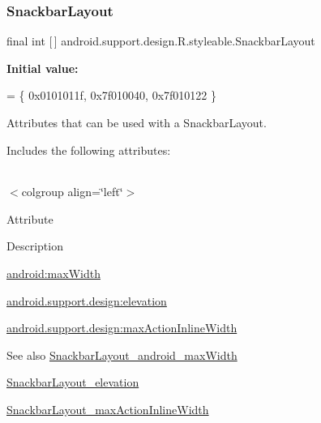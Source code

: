 \subsubsection{\texorpdfstring{Snackbar\+Layout}{SnackbarLayout}}
{\footnotesize\ttfamily final int \mbox{[}$\,$\mbox{]} android.\+support.\+design.\+R.\+styleable.\+Snackbar\+Layout\hspace{0.3cm}{\ttfamily [static]}}

{\bfseries Initial value\+:}
\begin{DoxyCode}
= \{
            0x0101011f, 0x7f010040, 0x7f010122
        \}
\end{DoxyCode}
Attributes that can be used with a Snackbar\+Layout. 

Includes the following attributes\+:

\tabulinesep=1mm
\begin{longtabu} spread 0pt [c]{*{0}{|X[-1]}|}
\hline
\end{longtabu}
$<$colgroup align=\char`\"{}left\char`\"{}$>$ 

Attribute

Description 

{\ttfamily \hyperlink{classandroid_1_1support_1_1design_1_1R_1_1styleable_a402146713ec6bfdca0ad3ae02e6731fe}{android\+:max\+Width}}

{\ttfamily \hyperlink{classandroid_1_1support_1_1design_1_1R_1_1styleable_ab3ccaab6fd75451ae24c27558c096f8a}{android.\+support.\+design\+:elevation}}

{\ttfamily \hyperlink{classandroid_1_1support_1_1design_1_1R_1_1styleable_a66890a4c37503ae7fd6e09cbefc592bf}{android.\+support.\+design\+:max\+Action\+Inline\+Width}}

\begin{DoxySeeAlso}{See also}
\hyperlink{classandroid_1_1support_1_1design_1_1R_1_1styleable_a402146713ec6bfdca0ad3ae02e6731fe}{Snackbar\+Layout\+\_\+android\+\_\+max\+Width} 

\hyperlink{classandroid_1_1support_1_1design_1_1R_1_1styleable_ab3ccaab6fd75451ae24c27558c096f8a}{Snackbar\+Layout\+\_\+elevation} 

\hyperlink{classandroid_1_1support_1_1design_1_1R_1_1styleable_a66890a4c37503ae7fd6e09cbefc592bf}{Snackbar\+Layout\+\_\+max\+Action\+Inline\+Width} 
\end{DoxySeeAlso}
\mbox{\label{classandroid_1_1support_1_1design_1_1R_1_1styleable_a402146713ec6bfdca0ad3ae02e6731fe}} 
